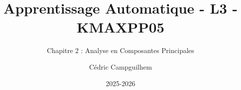\documentclass[10pt]{beamer}  %
\title{Apprentissage Automatique - L3 - KMAXPP05}
\subtitle{Chapitre 2 : Analyse en Composantes Principales}
\author{Cédric Campguilhem}
\institute[]{
	Airbus Operations \\
	\href{mailto:cedric.campguilhem@airbus.com}{\texttt{cedric.campguilhem@airbus.com}}
}
\date{2025-2026}
\begin{document}
	
	\begin{frame}
		\titlepage
	\end{frame}
	
	
	
	
	
	
	
	
\end{document}
